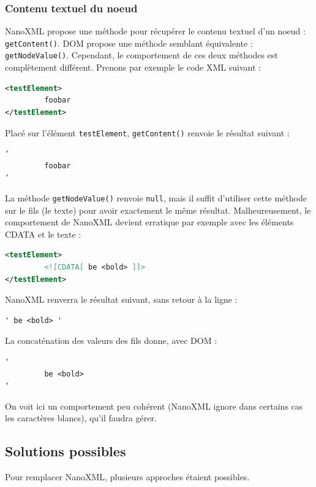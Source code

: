 \subsubsection{Contenu textuel du noeud}
NanoXML propose une méthode pour récupérer le contenu textuel d'un noeud : \verb|getContent()|.
DOM propose une méthode semblant équivalente : \verb|getNodeValue()|.
Cependant, le comportement de ces deux méthodes est complètement différent.
Prenons par exemple le code XML suivant :
\begin{lstlisting}[language=XML]
<testElement>
         foobar
</testElement>
\end{lstlisting}
Placé sur l'élément \verb|testElement|, \verb|getContent()| renvoie le résultat suivant :
\begin{lstlisting}
'
         foobar
'
\end{lstlisting}
La méthode \verb|getNodeValue()| renvoie \verb|null|, mais il suffit d'utiliser cette méthode sur le fils (le texte) pour avoir exactement le même résultat.
Malheureusement, le comportement de NanoXML devient erratique par exemple avec les éléments CDATA et le texte :
\begin{lstlisting}[language=XML]
<testElement>
         <![CDATA[ be <bold> ]]>
</testElement>
\end{lstlisting}
NanoXML renverra le résultat suivant, sans retour à la ligne :
\begin{lstlisting}
' be <bold> '
\end{lstlisting}
La concaténation des valeurs des fils donne, avec DOM :
\begin{lstlisting}
'
         be <bold>
'
\end{lstlisting}
On voit ici un comportement peu cohérent (NanoXML ignore dans certains cas les caractères blancs), qu'il faudra gérer.

\subsection{Solutions possibles}
Pour remplacer NanoXML, plusieurs approches étaient possibles.

